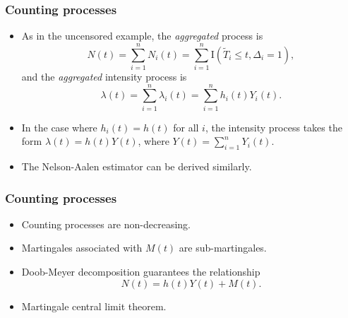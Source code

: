 \documentclass[10pt]{beamer}\usepackage[]{graphicx}\usepackage[]{color}
\newcommand{\empr}[1]{{\emph{\color{red}#1}}}
\newcommand{\I}{\mathrm{I}}
\begin{document}
\begin{frame}
  \frametitle{Counting processes}
  \begin{itemize}  
  \item As in the uncensored example, the \empr{aggregated} process is
    $$N(t) = \sum_{i = 1}^nN_i(t)= \sum_{i = 1}^n\I(\tilde{T}_i\le t, \Delta_i = 1),$$
    and the \empr{aggregated} intensity process is 
    $$ \lambda(t) = \sum_{i = 1}^n\lambda_i(t) = \sum_{i = 1}^nh_i(t)Y_i(t). $$
  \item In the case where $h_i(t) = h(t)$ for all $i$, 
    the intensity process takes the form $\lambda(t) = h(t)Y(t)$,
    where $Y(t) = \sum_{i = 1}^nY_i(t)$.
  \item The Nelson-Aalen estimator can be derived similarly.
  \end{itemize}
\end{frame} 

\begin{frame}
  \frametitle{Counting processes}
  \begin{itemize}  
  \item Counting processes are non-decreasing.
  \item Martingales associated with $M(t)$ are sub-martingales.
  \item Doob-Meyer decomposition guarantees the relationship 
    $$ N(t) = h(t)Y(t) + M(t).$$
  \item Martingale central limit theorem.
  \end{itemize}
\end{frame} 
\end{document}
